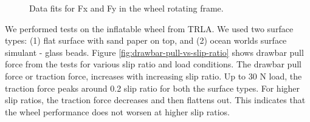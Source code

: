 \documentclass{article}
\begin{document}
\begin{figure}[hbt!]
\begin{minipage}{0.45\textwidth}
    \end{minipage}
    \caption{Data fits for Fx and Fy in the wheel rotating frame.}
    \label{data-fits}
\end{figure}

We performed tests on the inflatable wheel from TRLA. We used two surface types: (1) flat surface with sand paper on top, and (2) ocean worlds surface simulant - glass beads. Figure \ref{fig:drawbar-pull-vs-slip-ratio} shows drawbar pull force from the tests for various slip ratio and load conditions. The drawbar pull force or traction force, increases with increasing slip ratio. Up to 30 N load, the traction force peaks around 0.2 slip ratio for both the surface types. For higher slip ratios, the traction force decreases and then flattens out. This indicates that the wheel performance does not worsen at higher slip ratios. 
\end{document}

